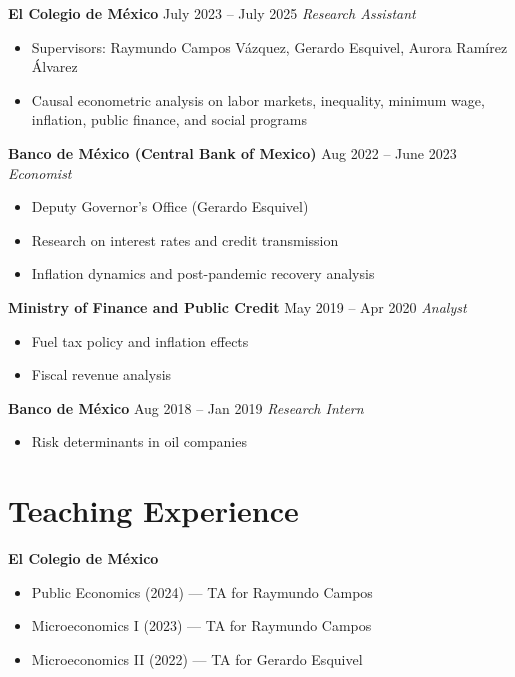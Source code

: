 \documentclass[11pt]{article}
\begin{document}
\textbf{El Colegio de México} \hfill July 2023 -- July 2025
\textit{Research Assistant}

\begin{itemize}
\item Supervisors: Raymundo Campos Vázquez, Gerardo Esquivel, Aurora Ramírez Álvarez
\item Causal econometric analysis on labor markets, inequality, minimum wage, inflation, public finance, and social programs
\end{itemize}

\textbf{Banco de México (Central Bank of Mexico)} \hfill Aug 2022 -- June 2023  
\textit{Economist}

\begin{itemize}
\item Deputy Governor’s Office (Gerardo Esquivel)
\item Research on interest rates and credit transmission
\item Inflation dynamics and post-pandemic recovery analysis
\end{itemize}

\textbf{Ministry of Finance and Public Credit} \hfill May 2019 -- Apr 2020  
\textit{Analyst}

\begin{itemize}
\item Fuel tax policy and inflation effects
\item Fiscal revenue analysis
\end{itemize}

\textbf{Banco de México} \hfill Aug 2018 -- Jan 2019  
\textit{Research Intern}

\begin{itemize}
\item Risk determinants in oil companies
\end{itemize}


\section*{Teaching Experience}

\textbf{El Colegio de México}

\begin{itemize}
\item Public Economics (2024) — TA for Raymundo Campos
\item Microeconomics I (2023) — TA for Raymundo Campos
\item Microeconomics II (2022) — TA for Gerardo Esquivel
\end{itemize}
\end{document}
